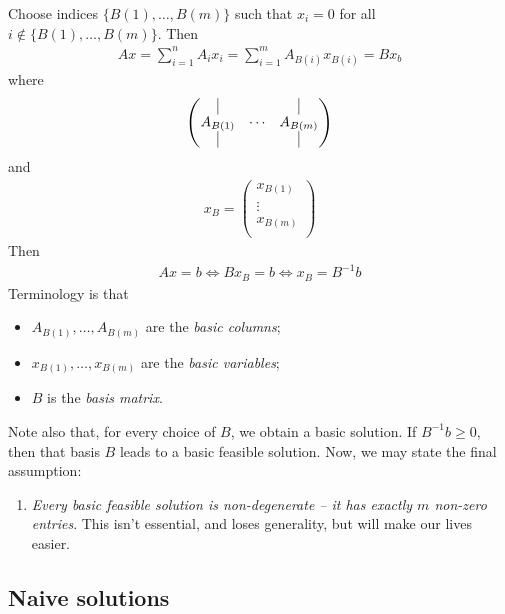 \documentclass{../../template/note}
\begin{document}
    Choose indices $\{B(1), \dots, B(m)\}$ such that $x_i = 0$ for all $i \notin \{B(1), \dots, B(m)\}$. Then
    \begin{align*}
        Ax = \sum_{i=1}^n A_ix_i = \sum_{i=1}^m A_{B(i)}x_{B(i)} = Bx_b
    \end{align*}
    where
    \begin{align*}
        \begin{pmatrix}
            \vline & & \vline \\ 
            A_{B(1)} & \cdots & A_{B(m)} \\
            \vline & & \vline \\ 
        \end{pmatrix}
    \end{align*}
    and
    \begin{align*}
        x_B = \begin{pmatrix}
            x_{B(1)} \\
            \vdots \\
            x_{B(m)} \\
        \end{pmatrix}
    \end{align*}
    Then
    \begin{align*}
        Ax = b \iff Bx_B = b \iff x_B = B^{-1}b
    \end{align*}
    Terminology is that
    \begin{itemize}
        \item $A_{B(1)}, \dots, A_{B(m)}$ are the \emph{basic columns};
        \item $x_{B(1)}, \dots, x_{B(m)}$ are the \emph{basic variables};
        \item $B$ is the \emph{basis matrix}.
    \end{itemize}
    Note also that, for every choice of $B$, we obtain a basic solution. If $B^{-1}b \geq 0$, then that basis $B$ leads to a basic feasible solution. Now, we may state the final assumption:
    \begin{enumerate}[resume, label=\protect\circled{\arabic*}] 
        \item \emph{Every basic feasible solution is non-degenerate -- it has exactly $m$ non-zero entries}. This isn't essential, and loses generality, but will make our lives easier.
    \end{enumerate}
    
    \subsection{Naive solutions}
\end{document}
